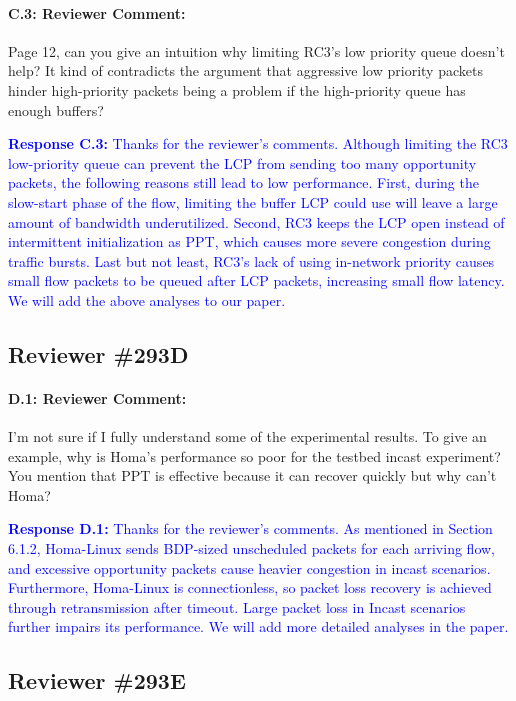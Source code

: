 \documentclass[12pt,one-column]{article}
\begin{document}
{\it \paragraph{C.3: Reviewer Comment:} Page 12, can you give an intuition why limiting RC3’s low priority queue doesn’t help? It kind of contradicts the argument that aggressive low priority packets hinder high-priority packets being a problem if the high-priority queue has enough buffers?}


\noindent\textcolor{blue}{\textbf{Response C.3:}
Thanks for the reviewer's comments. 
Although limiting the RC3 low-priority queue can prevent the LCP from sending too many opportunity packets, the following reasons still lead to low performance.
First, during the slow-start phase of the flow, limiting the buffer LCP could use will leave a large amount of bandwidth underutilized.
Second, RC3 keeps the LCP open instead of intermittent initialization as PPT, which causes more severe congestion during traffic bursts.
Last but not least, RC3's lack of using in-network priority causes small flow packets to be queued after LCP packets, increasing small flow latency.
We will add the above analyses to our paper.
}


\subsection{Reviewer \#293D}
{\it \paragraph{D.1: Reviewer Comment:} I'm not sure if I fully understand some of the experimental results. To give an example, why is Homa's performance so poor for the testbed incast experiment? You mention that PPT is effective because it can recover quickly but why can't Homa?}


\noindent\textcolor{blue}{\textbf{Response D.1:}
Thanks for the reviewer’s comments. 
As mentioned in Section 6.1.2, Homa-Linux sends BDP-sized unscheduled packets for each arriving flow, and excessive opportunity packets cause heavier congestion in incast scenarios.
Furthermore, Homa-Linux is connectionless, so packet loss recovery is achieved through retransmission after timeout.
Large packet loss in Incast scenarios further impairs its performance.
We will add more detailed analyses in the paper.
}

\subsection{Reviewer \#293E}
\end{document}
